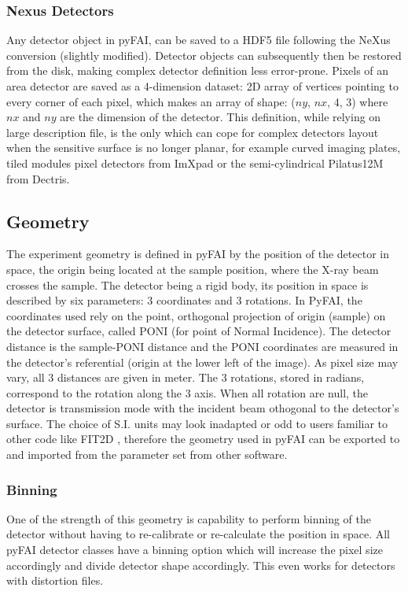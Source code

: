 \documentclass[preprint]{iucr}
\begin{document}
\subsubsection{Nexus Detectors}
Any detector object in pyFAI, can be saved to a HDF5 file following the NeXus
\cite{nexus} conversion (slightly modified).
Detector objects can subsequently then be restored from the disk, making
complex detector definition less error-prone.
Pixels of an area detector are saved as a 4-dimension dataset: 2D
array of vertices pointing to every corner of each pixel, which makes an array
of shape: ($ny$, $nx$, 4, 3) where $nx$ and $ny$ are the dimension of the
detector.
This definition, while relying on large description file, is the only which
can cope for complex detectors layout when the sensitive surface is no
longer planar, for example curved imaging plates, tiled modules pixel detectors
from ImXpad or the semi-cylindrical Pilatus12M from Dectris.

\subsection{Geometry}
The experiment geometry is defined in pyFAI by the position of the detector in
space, the origin being located at the sample position, where the X-ray beam
crosses the sample.
The detector being a rigid body, its position in space is described by six
parameters: 3 coordinates and 3 rotations. 
In PyFAI, the coordinates used rely on the point, orthogonal projection of
origin (sample) on the detector surface, called PONI (for point of Normal
Incidence). The detector distance is the sample-PONI distance and the PONI
coordinates are measured in the detector's referential (origin at the lower
left of the image). As pixel size may vary, all 3 distances are given in meter.
The 3 rotations, stored in radians, correspond to the rotation along the 3 axis.
When all rotation are null, the detector is transmission mode with the incident
beam othogonal to the detector's surface.
The choice of S.I. units may look inadapted or odd to users familiar to
other code like FIT2D \cite{fit2d}, therefore the geometry used in pyFAI can be
exported to and imported from the parameter set from other software.
 
\subsubsection{Binning}
One of the strength of this geometry is capability to perform binning of the
detector without having to re-calibrate or re-calculate the position in space.
All pyFAI detector classes have a binning option which will increase the pixel
size accordingly and divide detector shape accordingly. 
This even works for detectors with distortion files. 
\end{document}
